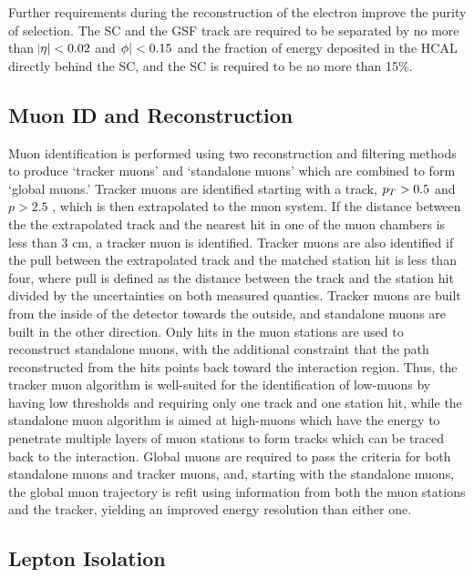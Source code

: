  Further requirements during the reconstruction of
  the electron improve the purity of selection.
 The SC and the GSF track are required to 
  be separated by no more than $\abs{\eta}<0.02$
  and $\abs{\phi}<0.15$ and the fraction of
  energy deposited in the HCAL directly behind
  the SC, and the SC is required to be no more
  than 15\%.
 
\subsection{Muon ID and Reconstruction}

 Muon identification is performed using
  two reconstruction and filtering methods to produce 
  `tracker muons' and `standalone muons' which are 
  combined to form  `global muons.'
 Tracker muons are identified starting with
  a track, $p_T>0.5$ \GeV and $p>2.5$ \GeV,
  which is then extrapolated to the muon system.
 If the distance between the the extrapolated
  track and the nearest hit in one of the muon 
  chambers is less than 3 cm, a tracker muon
  is identified.
 Tracker muons are also identified if the 
  pull between the extrapolated track and the
  matched station hit is less than four, where
  pull is defined as the distance between
  the track and the station hit divided by 
  the uncertainties on both measured quanties.
 Tracker muons are built from the inside of the
  detector towards the outside, and 
  standalone muons are built in the other direction.
 Only hits in the muon stations are used to 
  reconstruct standalone muons, with the 
  additional constraint that the path reconstructed
  from the hits points back toward the 
  interaction region.
 Thus, the tracker muon algorithm is well-suited
  for the identification of low-\pt muons by having
  low thresholds and requiring only one track
  and one station hit, while the standalone
  muon algorithm is aimed at high-\pt muons
  which have the energy to penetrate multiple layers
  of muon stations to form tracks which can be
  traced back to the interaction.
 Global muons are required to pass the criteria for both 
  standalone muons and tracker muons, and,
  starting with the standalone muons, 
  the global muon trajectory is refit using information from both 
  the muon stations and the tracker,
  yielding an improved energy resolution than either one.

\subsection{Lepton Isolation}

